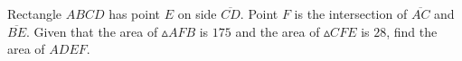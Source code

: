 Rectangle $ABCD$ has point $E$ on side $\overline{CD}$. Point $F$ is the intersection of  $\overline{AC}$ and  $\overline{BE}$. Given that the area of $\vartriangle AFB$ is $175$ and the area of $\vartriangle CFE$ is $28$, find the area of $ADEF$.
